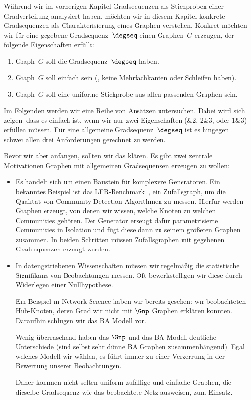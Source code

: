 Während wir im vorherigen Kapitel Gradsequenzen als Stichproben einer Gradverteilung analysiert haben, möchten wir in diesem Kapitel konkrete Gradsequenzen als Charakterisierung eines Graphen verstehen.
Konkret möchten wir für eine gegebene Gradsequenz~$\degseq$ einen Graphen~$G$ erzeugen, der folgende Eigenschaften erfüllt:
\begin{enumerate}
    \item Graph~$G$ soll die Gradsequenz~$\degseq$ haben.
    \item Graph~$G$ soll einfach sein (\dh, keine Mehrfachkanten oder Schleifen haben).
    \item Graph~$G$ soll eine uniforme Stichprobe aus allen passenden Graphen sein.
\end{enumerate}

Im Folgenden werden wir eine Reihe von Ansätzen untersuchen.
Dabei wird sich zeigen, dass es einfach ist, wenn wir nur zwei Eigenschaften (\&2, 2\&3, oder 1\&3) erfüllen müssen.
Für eine allgemeine Gradsequenz~$\degseq$ ist es hingegen schwer allen drei Anforderungen gerechnet zu werden.

Bevor wir aber anfangen, sollten wir das  klären.
Es gibt zwei zentrale Motivationen Graphen mit allgemeinen Gradsequenzen erzeugen zu wollen:
\begin{itemize}
    \item
          Es handelt sich um einen Baustein für komplexere Generatoren.
          Ein bekanntes Beispiel ist das LFR-Benchmark~\cite{lancichinetti2008benchmark}, ein Zufallsgraph, um die Qualität von Community-Detection-Algorithmen zu messen.
          Hierfür werden Graphen erzeugt, von denen wir wissen, welche Knoten zu welchen Communities gehören.
          Der Generator erzeugt dafür parametrisierte Communities in Isolation und fügt diese dann zu seinem größeren Graphen zusammen.
          In beiden Schritten müssen Zufallsgraphen mit gegebenen Gradsequenzen erzeugt werden.

    \item
          In datengetriebenen Wissenschaften müssen wir regelmäßig die statistische Signifikanz von Beobachtungen messen.
          Oft bewerkstelligen wir diese durch Widerlegen einer Nullhypothese.

          Ein Beispiel in Network Science haben wir bereits gesehen:
          wir beobachteten Hub-Knoten, deren Grad wir nicht mit $\Gnp$ Graphen erklären konnten.
          Daraufhin schlugen wir das BA Modell vor.

          Wenig überraschend haben das $\Gnp$ und das BA Modell deutliche Unterschiede (\zB sind selbst sehr dünne BA Graphen zusammenhängend).
          Egal welches Modell wir wählen, es führt immer zu einer Verzerrung in der Bewertung unserer Beobachtungen.

          Daher kommen nicht selten uniform zufällige und einfache Graphen, die dieselbe Gradsequenz wie das beobachtete Netz ausweisen, zum Einsatz.
\end{itemize}

